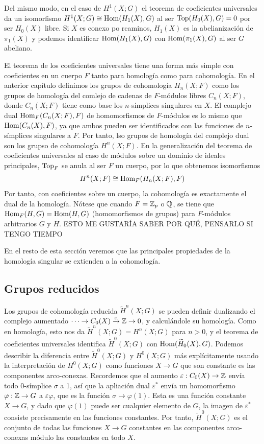 \documentclass[TA.tex]{subfiles}
\begin{document}
Del mismo modo, en el caso de $H^1(X;G)$ el teorema de coeficientes universales da un isomorfismo $H^1(X;G)\cong\operatorname{Hom}(H_1(X),G)$ al ser $\operatorname{Top}(H_0(X),G)=0$ por ser $H_0(X)$ libre. Si $X$ es conexo po rcaminos, $H_1(X)$ es la abelianización de $\pi_1(X)$ y podemos identificar $\operatorname{Hom}(H_1(X),G)$ con $\operatorname{Hom}(\pi_1(X),G)$ al ser $G$ abeliano.

El teorema de los coeficientes universales tiene una forma más simple con coeficientes en un cuerpo $F$ tanto para homología como para cohomología. En el anterior capítulo definimos los grupos de cohomología $H_n(X;F)$ como los grupos de homología del comlejo de cadenas de $F$-módulos libres $C_n(X;F)$, donde $C_n(X;F)$ tiene como base los $n$-símplices singulares en $X$. El complejo dual $\operatorname{Hom}_F(C_n(X;F),F)$ de homomorfismos de $F$-módulos es lo mismo que $\operatorname{Hom}(C_n(X),F)$, ya que ambos pueden ser identificados con las funciones de $n$-símplices singulares a $F$. Por tanto, lso grupos de homología del complejo dual son los grupso de cohomología $H^n(X;F)$. En la generalización del teorema de coeficientes universales al caso de módulos sobre un dominio de ideales principales, $\operatorname{Top}_F$ se anula al ser $F$ un cuerpo, por lo que obtenemos isomorfismos
\[
H^n(X;F)\cong \operatorname{Hom}_F(H_n(X;F),F)
\]
Por tanto, con coeficientes sobre un cuerpo, la cohomología es exactamente el dual de la homología. Nótese que cuando $F=\mathbb{Z}_p$ o $\mathbb{Q}$, se tiene que $\operatorname{Hom}_F(H,G)=\operatorname{Hom}(H,G)$ (homomorfismos de grupos) para $F$-módulos arbitrarios $G$ y $H$. ESTO ME GUSTARÍA SABER POR QUÉ, PENSARLO SI TENGO TIEMPO 

En el resto de esta sección veremos que las principales propiedades de la homología singular se extienden a la cohomología. 

\subsection{Grupos reducidos}
Los grupos de cohomología reducida $\widetilde{H}^n(X;G)$ se pueden definir dualizando el complejo aumentado $\cdots\to C_0(X)\xrightarrow{\varepsilon}\mathbb{Z}\to 0$, y calculándole su homología. Como en homología, esto nos da $\widetilde{H}^n(X;G)=H^n(X;G)$ para $n>0$, y el teorema de coeficientes universales identifica $\widetilde{H}^0(X;G)$ con $\operatorname{Hom}(\widetilde{H}_0(X),G)$. Podemos describir la diferencia entre $\widetilde{H}^0(X;G)$ y $H^0(X;G)$ más explícitamente usando la interpretación de $H^0(X;G)$ como funciones $X\to G$ que son constante es las componentes arco-conexas. Recordemos que el aumento $\varepsilon:C_0(X)\to\mathbb{Z}$ envía todo 0-símplice $\sigma$ a 1, así que la apliación dual $\varepsilon^*$ envía un homomorfismo $\varphi:\mathbb{Z}\to G$ a $\varepsilon\varphi$, que es la función $\sigma\mapsto\varphi(1)$. Esta es una función constante $X\to G$, y dado que $\varphi(1)$ puede ser cualquier elemento de $G$, la imagen de $\varepsilon^*$ consiste precisamente en las funciones constantes. Por tanto, $\widetilde{H}^0(X;G)$ es el conjunto de todas las funciones $X\to G$ constantes en las componentes arco-conexas módulo las constantes en todo $X$.
\end{document}

